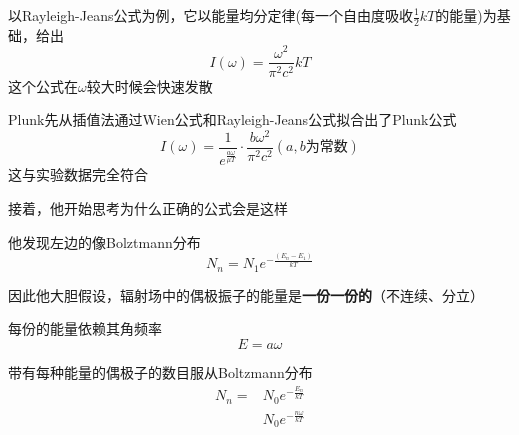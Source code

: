 \documentclass[lang=cn,15pt]{elegantbook}
\begin{document}
以Rayleigh-Jeans公式为例，它以能量均分定律(每一个自由度吸收$\frac{1}{2}kT$的能量)为基础，给出
\begin{equation}
	I\left( \omega \right) =\frac{\omega ^2}{\pi ^2c^2}kT
\end{equation}
这个公式在$\omega$较大时候会快速发散

Plunk先从插值法通过Wien公式和Rayleigh-Jeans公式拟合出了Plunk公式
\begin{equation}
	I\left( \omega \right) =\frac{1}{e^{\frac{a\omega}{\mu T}}}\cdot \frac{b\omega ^2}{\pi ^2c^2}\left( a,b\text{为常数} \right) 
\end{equation}
这与实验数据完全符合

接着，他开始思考为什么正确的公式会是这样

他发现左边的像Bolztmann分布
\begin{equation}
	N_n=N_1e^{-\frac{\left( E_n-E_1 \right)}{kT}}
\end{equation}

因此他大胆假设，辐射场中的偶极振子的能量是\textbf{一份一份的}（不连续、分立）

每份的能量依赖其角频率
\begin{equation}
	E=a\omega
\end{equation}

带有每种能量的偶极子的数目服从Boltzmann分布
\begin{equation}
	\begin{split}
		N_n=&N_0e^{-\frac{E_n}{kT}}\\
		&N_0e^{-\frac{n\omega}{kT}}
	\end{split}
\end{equation}
\end{document}
